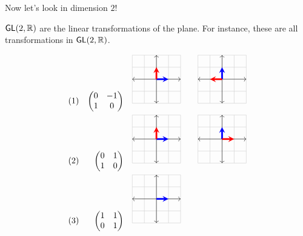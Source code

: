 \documentclass[../main.tex]{subfiles}
\begin{document}
Now let's look in dimension $2$!

$\mathsf{GL}(2,\mathbb{R})$ are the linear transformations of the plane. For instance,
these are all transformations in $\mathsf{GL}(2,\mathbb{R})$.


\begin{align*}
  (1) && 
\begin{pmatrix}
  0 & -1 \\ 1 & 0
\end{pmatrix}
  &&&
\begin{tikzpicture}[scale=0.5]
  \draw[thin,gray!40] (-2,-2) grid (2,2);
  \draw[<->] (-2,0)--(2,0);
  \draw[<->] (0,-2)--(0,2);
  \draw[line width=2pt,blue,-stealth](0,0)--(1,0);
  \draw[line width=2pt,red,-stealth](0,0)--(0,1);
\end{tikzpicture}
  &&&
\begin{tikzpicture}[scale=0.5]
  \draw[thin,gray!40] (-2,-2) grid (2,2);
  \draw[<->] (-2,0)--(2,0);
  \draw[<->] (0,-2)--(0,2);
  \draw[line width=2pt,blue,-stealth](0,0)--(0,1);
  \draw[line width=2pt,red,-stealth](0,0)--(-1,0);
\end{tikzpicture} \\
  (2) && 
\begin{pmatrix}
  0 & 1 \\ 1 & 0
\end{pmatrix}
  &&&
\begin{tikzpicture}[scale=0.5]
  \draw[thin,gray!40] (-2,-2) grid (2,2);
  \draw[<->] (-2,0)--(2,0);
  \draw[<->] (0,-2)--(0,2);
  \draw[line width=2pt,blue,-stealth](0,0)--(1,0);
  \draw[line width=2pt,red,-stealth](0,0)--(0,1);
\end{tikzpicture}
  &&&
\begin{tikzpicture}[scale=0.5]
  \draw[thin,gray!40] (-2,-2) grid (2,2);
  \draw[<->] (-2,0)--(2,0);
  \draw[<->] (0,-2)--(0,2);
  \draw[line width=2pt,blue,-stealth](0,0)--(0,1);
  \draw[line width=2pt,red,-stealth](0,0)--(1,0);
\end{tikzpicture} \\
  (3) && 
\begin{pmatrix}
  1 & 1 \\ 0 & 1
\end{pmatrix}
  &&&
\begin{tikzpicture}[scale=0.5]
  \draw[thin,gray!40] (-2,-2) grid (2,2);
  \draw[<->] (-2,0)--(2,0);
  \draw[<->] (0,-2)--(0,2);
  \draw[line width=2pt,blue,-stealth](0,0)--(1,0);

\end{tikzpicture}
\end{align*}
\end{document}
